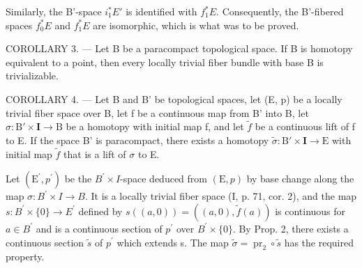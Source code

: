 Similarly, the B'-space \(i_{1}^{*}E'\) is identified with \(f_{1}^{*}E\). Consequently, the B'-fibered spaces \(f_{0}^{*}E\) and \(f_{1}^{*}E\) are isomorphic, which is what was to be proved.

COROLLARY 3. --- Let B be a paracompact topological space. If B is homotopy equivalent to a point, then every locally trivial fiber bundle with base B is trivializable.

COROLLARY 4. --- Let B and B' be topological spaces, let (E, p) be a locally trivial fiber space over B, let f be a continuous map from B' into B, let \(\sigma: \mathrm{B}' \times \mathbf{I} \to \mathrm{B}\) be a homotopy with initial map f, and let \(\widetilde{f}\) be a continuous lift of f to E. If the space B' is paracompact, there exists a homotopy \(\widetilde{\sigma}: \mathrm{B}' \times \mathbf{I} \to \mathrm{E}\) with initial map \(\widetilde{f}\) that is a lift of \(\sigma\) to E.

Let \((\mathrm{E}^{\prime},p^{\prime})\) be the \(B^{\prime}\times I\)-space deduced from \((\mathrm{E},p)\) by base change along the map \(\sigma\colon B^{\prime}\times I\to B\). It is a locally trivial fiber space (I, p. 71, cor. 2), and the map \(s\colon B^{\prime}\times\{0\}\to E^{\prime}\) defined by \(s((a,0))=((a,0),\widetilde{f}(a))\) is continuous for \(a\in B^{\prime}\) and is a continuous section of \(p^{\prime}\) over \(B^{\prime}\times\{0\}\). By Prop. 2, there exists a continuous section \(\widetilde{s}\) of \(p^{\prime}\) which extends s. The map \(\widetilde{\sigma}=\operatorname{pr}_{2}\circ\widetilde{s}\) has the required property.


